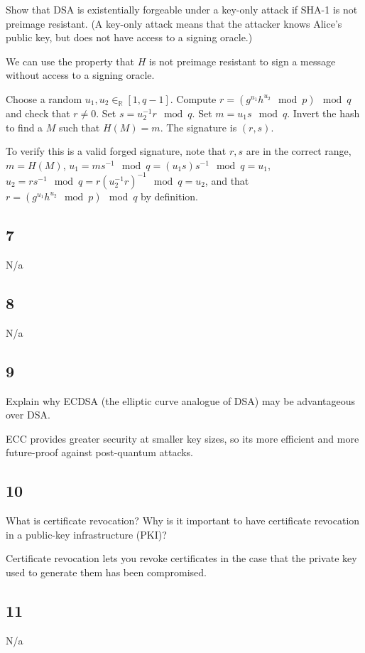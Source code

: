 \documentclass[11pt]{article}
\begin{document}
Show that DSA is existentially forgeable under a key-only attack if SHA-1 is not preimage resistant. (A key-only attack means that the attacker knows Alice's public key, but does not have access to a signing oracle.)

We can use the property that $H$ is not preimage resistant to sign a message without access to a signing oracle.

Choose a random $u_1, u_2 \in_\mathbb{R} [1, q - 1]$. Compute $r = (g^{u_1} h^{u_2} \mod p) \mod q$ and check that $r \neq 0$. Set $s = u_2^{-1} r \mod q$. Set $m = u_1 s \mod q$. Invert the hash to find a $M$ such that $H(M) = m$. The signature is $(r, s)$.

To verify this is a valid forged signature, note that $r,s$ are in the correct range, $m = H(M)$, $u_1 = m s^{-1} \mod q = (u_1 s) s^{-1} \mod q = u_1$, $u_2 = r s^{-1} \mod q = r (u_2^{-1} r)^{-1} \mod q = u_2$, and that $r = (g^{u_1} h^{u_2} \mod p) \mod q$ by definition.

\subsection{7} N/a

\subsection{8} N/a

\subsection{9}  Explain why ECDSA (the elliptic curve analogue of DSA) may be advantageous over DSA.

ECC provides greater security at smaller key sizes, so its more efficient and more future-proof against post-quantum attacks.

\subsection{10} What is certiﬁcate revocation? Why is it important to have certiﬁcate revocation in a public-key infrastructure (PKI)?

Certificate revocation lets you revoke certificates in the case that the private key used to generate them has been compromised.

\subsection{11} N/a
\end{document}
